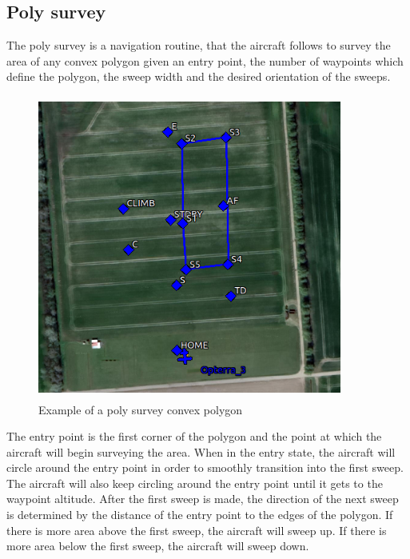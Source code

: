 \subsection{Poly survey}
The poly survey is a navigation routine, that the aircraft follows to survey the area of any convex polygon given an entry point, the number of waypoints which define the polygon, the sweep width and the desired orientation of the sweeps.
\begin{figure}[H]
\centering
\includegraphics[width=10cm,height=10cm,keepaspectratio]{imagenes/Convex_polygon.png}
\caption{Example of a poly survey convex polygon}
\label{fig:fixed-wing_UAS}
\end{figure}
The entry point is the first corner of the polygon and the point at which the aircraft will begin surveying the area. When in the entry state, the aircraft will circle around the entry point in order to smoothly transition into the first sweep. The aircraft will also keep circling around the entry point until it gets to the waypoint altitude. After the first sweep is made, the direction of the next sweep is determined by the distance of the entry point to the edges of the polygon. If there is more area above the first sweep, the aircraft will sweep up. If there is more area below the first sweep, the aircraft will sweep down.\cite{Poly_survey}

